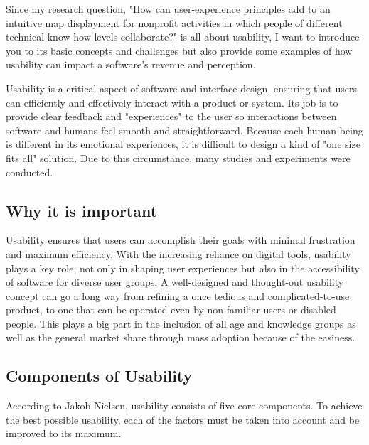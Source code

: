 \Author{\daAuthorTwo}

Since my research question, "How can user-experience principles add to an intuitive map displayment for nonprofit activities in which people of different technical know-how levels collaborate?" is all about usability, I want to introduce you to its basic concepts and challenges but also provide some examples of how usability can impact a software's revenue and perception.

\blankLine

Usability is a critical aspect of software and interface design, ensuring that users can efficiently and effectively interact with a product or system. Its job is to provide clear feedback and "experiences" to the user so interactions between software and humans feel smooth and straightforward. Because each human being is different in its emotional experiences, it is difficult to design a kind of "one size fits all" solution. Due to this circumstance, many studies and experiments were conducted. \autocite{Paul:Usability101}

\subsection{Why it is important}

Usability ensures that users can accomplish their goals with minimal frustration and maximum efficiency. With the increasing reliance on digital tools, usability plays a key role, not only in shaping user experiences but also in the accessibility of software for diverse user groups. A well-designed and thought-out usability concept can go a long way from refining a once tedious and complicated-to-use product, to one that can be operated even by non-familiar users or disabled people. This plays a big part in the inclusion of all age and knowledge groups as well as the general market share through mass adoption because of the easiness.

\subsection{Components of Usability}

According to Jakob Nielsen, usability consists of five core components. To achieve the best possible usability, each of the factors must be taken into account and be improved to its maximum.

